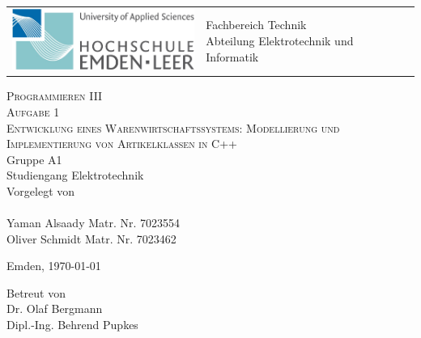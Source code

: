 \begin{titlepage}

\vspace{-0.5cm}
\hspace{-0.5cm}
\begin{tabular}{p{8.0cm} p{8.0cm}}
  \includegraphics[width = 6.0cm]{../tex/hsel-allgemein.png} &
   \parbox[b]{8.0cm}{
     {\large 	Fachbereich Technik }\\
     {\large 	Abteilung Elektrotechnik und Informatik }     
    } \\
   \\
   \hline
\end{tabular}
%
\begin{center}

\vspace{2.5cm}
\LARGE{\textsc{
    Programmieren III\\ Aufgabe 1
}}\\

\vspace{2.5cm}
\LARGE{\textsc{
{Entwicklung eines Warenwirtschaftssystems: Modellierung und Implementierung von Artikelklassen in C++}
}}\\

\vspace{2cm}%
\large
Gruppe A1\\
Studiengang Elektrotechnik\\
Vorgelegt von\\\ \\
Yaman Alsaady\hspace{2cm} Matr. Nr. 7023554\\
Oliver Schmidt\hspace{2cm} Matr. Nr. 7023462


\vspace{1cm} 
Emden, \today

\vspace{3.5cm}%
Betreut von\\ Dr. Olaf Bergmann\\Dipl.-Ing. Behrend Pupkes

\end{center}
\normalsize
\end{titlepage}
